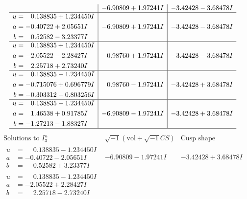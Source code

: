 \documentclass[1p]{elsarticle_modified}
\theoremstyle{definition}
\newcommand{\I}{\sqrt{-1}}
\begin{document}
$$\begin{array}{c|c|c}
 & -6.90809 + 1.97241 I & -3.42428 - 3.68478 I \\ \hline\begin{aligned}
u &= \phantom{-}0.138835 + 1.234450 I \\
a &= -0.40722 + 2.05651 I \\
b &= \phantom{-}0.52582 - 3.23377 I\end{aligned}
 & -6.90809 + 1.97241 I & -3.42428 - 3.68478 I \\ \hline\begin{aligned}
u &= \phantom{-}0.138835 + 1.234450 I \\
a &= -2.05522 - 2.28427 I \\
b &= \phantom{-}2.25718 + 2.73240 I\end{aligned}
 & \phantom{-}0.98760 + 1.97241 I & -3.42428 - 3.68478 I \\ \hline\begin{aligned}
u &= \phantom{-}0.138835 - 1.234450 I \\
a &= -0.715076 + 0.696779 I \\
b &= -0.303312 - 0.803256 I\end{aligned}
 & \phantom{-}0.98760 - 1.97241 I & -3.42428 + 3.68478 I \\ \hline\begin{aligned}
u &= \phantom{-}0.138835 - 1.234450 I \\
a &= \phantom{-}1.46538 + 0.91785 I \\
b &= -1.27213 - 1.88327 I\end{aligned}
 & -6.90809 - 1.97241 I & -3.42428 + 3.68478 I\\
 \hline 
 \end{array}$$\newpage$$\begin{array}{c|c|c}  
\text{Solutions to }I^u_{3}& \I (\text{vol} + \sqrt{-1}CS) & \text{Cusp shape}\\
 \hline 
\begin{aligned}
u &= \phantom{-}0.138835 - 1.234450 I \\
a &= -0.40722 - 2.05651 I \\
b &= \phantom{-}0.52582 + 3.23377 I\end{aligned}
 & -6.90809 - 1.97241 I & -3.42428 + 3.68478 I \\ \hline\begin{aligned}
u &= \phantom{-}0.138835 - 1.234450 I \\
a &= -2.05522 + 2.28427 I \\
b &= \phantom{-}2.25718 - 2.73240 I\end{aligned}

\end{array}$$
\end{document}
